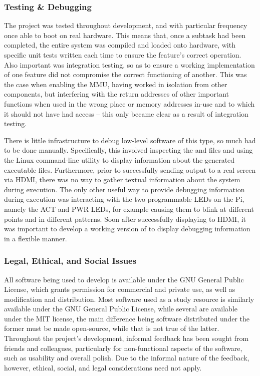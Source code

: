     \subsubsection{Testing \& Debugging}
        The project was tested throughout development, and with particular
        frequency once able to boot on real hardware. This means that, once a
        subtask had been completed, the entire system was compiled and loaded
        onto hardware, with specific unit tests written each time to ensure the
        feature's correct operation. Also important was integration testing, so
        as to ensure a working implementation of one feature did not compromise
        the correct functioning of another. This was the case when enabling the
        MMU, having worked in isolation from other components, but interfering
        with the return addresses of other important functions when used in the
        wrong place or memory addresses in-use and to which it should not have
        had access -- this only became clear as a result of integration testing.

        There is little infrastructure to debug low-level software of this type,
        so much had to be done manually. Specifically, this involved inspecting
        the  and  files and using the Linux command-line
        utility  \cite{nm} to display information about the generated
        executable files. Furthermore, prior to successfully sending output to a
        real screen via HDMI, there was no way to gather textual information
        about the system during execution. The only other useful way to provide
        debugging information during execution was interacting with the two
        programmable LEDs on the Pi, namely the ACT and PWR LEDs, for example
        causing them to blink at different points and in different patterns.
        Soon after successfully displaying to HDMI, it was important to develop
        a working version of  to display debugging information in a
        flexible manner.

    \subsubsection{Legal, Ethical, and Social Issues}
        All software being used to develop is available under the GNU General
        Public License, which grants permission for commercial and private use,
        as well as modification and distribution. Most software used as a study
        resource is similarly available under the GNU General Public License,
        while several are available under the MIT license, the main difference
        being software distributed under the former must be made open-source,
        while that is not true of the latter. Throughout the project's
        development, informal feedback has been sought from friends and
        colleagues, particularly for non-functional aspects of the software,
        such as usability and overall polish. Due to the informal nature of the
        feedback, however, ethical, social, and legal considerations need not
        apply.
